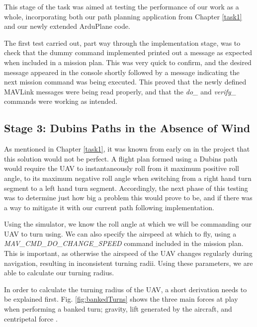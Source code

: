This stage of the task was aimed at testing the performance of our work as a whole, incorporating both our path planning application from Chapter \ref{task1} and our newly extended ArduPlane code. 

The first test carried out, part way through the implementation stage, was to check that the dummy command implemented printed out a message as expected when included in a mission plan. This was very quick to confirm, and the desired message appeared in the console shortly followed by a message indicating the next mission command was being executed. This proved that the newly defined MAVLink messages were being read properly, and that the \textit{do\_} and \textit{verify\_} commands were working as intended.

\subsection{Stage 3: Dubins Paths in the Absence of Wind}
\label{task2:nowind}

As mentioned in Chapter \ref{task1}, it was known from early on in the project that this solution would not be perfect. A flight plan formed using a Dubins path would require the UAV to instantaneously roll from it maximum positive roll angle, to its maximum negative roll angle when switching from a right hand turn segment to a left hand turn segment. Accordingly, the next phase of this testing was to determine just how big a problem this would prove to be, and if there was a way to mitigate it with our current path following implementation. 

Using the simulator, we know the roll angle at which we will be commanding our UAV to turn using. We can also specify the airspeed at which to fly, using a \textit{MAV\_CMD\_DO\_CHANGE\_SPEED} command included in the mission plan. This is important, as otherwise the airspeed of the UAV changes regularly during navigation, resulting in inconsistent turning radii. Using these parameters, we are able to calculate our turning radius.


In order to calculate the turning radius of the UAV, a short derivation needs to be explained first. Fig. \ref{fig:bankedTurns} shows the three main forces at play when performing a banked turn; gravity, lift generated by the aircraft, and centripetal force \cite{BankedTurnWiki}.

